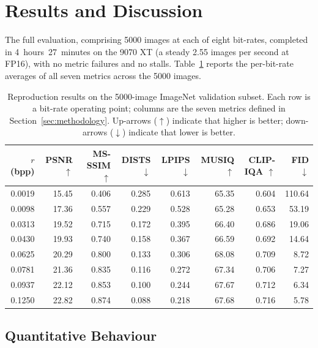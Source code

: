 \documentclass[conference]{IEEEtran}
\begin{document}
\section{Results and Discussion}
\label{sec:results}

The full evaluation, comprising 5000 images at each of eight bit-rates,
completed in 4~hours~27~minutes on the 9070 XT (a steady 2.55 images per
second at FP16), with no metric failures and no stalls.
Table~\ref{tab:results} reports the per-bit-rate averages of all seven
metrics across the 5000 images.

\begin{table}[t]
\caption{Reproduction results on the 5000-image ImageNet validation subset. Each row is a bit-rate operating point; columns are the seven metrics defined in Section~\ref{sec:methodology}. Up-arrows ($\uparrow$) indicate that higher is better; down-arrows ($\downarrow$) indicate that lower is better.}
\label{tab:results}
\begin{center}
\begin{tabular}{rrrrrrrr}
\toprule
$r$ (bpp) & PSNR $\uparrow$ & MS-SSIM $\uparrow$ & DISTS $\downarrow$ & LPIPS $\downarrow$ & MUSIQ $\uparrow$ & CLIP-IQA $\uparrow$ & FID $\downarrow$ \\
\midrule
0.0019 & 15.45 & 0.406 & 0.285 & 0.613 & 65.35 & 0.604 & 110.64 \\
0.0098 & 17.36 & 0.557 & 0.229 & 0.528 & 65.28 & 0.653 &  53.19 \\
0.0313 & 19.52 & 0.715 & 0.172 & 0.395 & 66.40 & 0.686 &  19.06 \\
0.0430 & 19.93 & 0.740 & 0.158 & 0.367 & 66.59 & 0.692 &  14.64 \\
0.0625 & 20.29 & 0.800 & 0.133 & 0.306 & 68.08 & 0.709 &   8.72 \\
0.0781 & 21.36 & 0.835 & 0.116 & 0.272 & 67.34 & 0.706 &   7.27 \\
0.0937 & 22.12 & 0.853 & 0.100 & 0.244 & 67.67 & 0.712 &   6.34 \\
0.1250 & 22.82 & 0.874 & 0.088 & 0.218 & 67.68 & 0.716 &   5.78 \\
\bottomrule
\end{tabular}
\end{center}
\end{table}

\subsection{Quantitative Behaviour}
\end{document}
